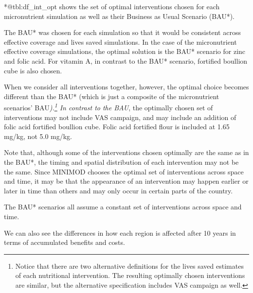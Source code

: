 \documentclass[
]{article}
\begin{document}
*@tbl:df\_int\_opt shows the set of optimal interventions chosen for
each micronutrient simulation as well as their Business as Usual
Scenario (BAU*).

The BAU* was chosen for each simulation so that it would be consistent
across effective coverage and lives saved simulations. In the case of
the micronutrient effective coverage simulations, the optimal solution
is the BAU* scenario for zinc and folic acid. For vitamin A, in contrast
to the BAU* scenario, fortified boullion cube is also chosen.

When we consider all interventions together, however, the optimal choice
becomes different than the BAU* (which is just a composite of the
micronutrient scenarios' BAU\emph{).\footnote{Notice that there are two
  alternative definitions for the lives saved estimates of each
  nutritional intervention. The resulting optimally chosen interventions
  are similar, but the alternative specification includes VAS campaign
  as well.} In contrast to the BAU}, the optimally chosen set of
interventions may not include VAS campaign, and may include an addition
of folic acid fortified boullion cube. Folic acid fortified flour is
included at 1.65 mg/kg, not 5.0 mg/kg.

Note that, although some of the interventions chosen optimally are the
same as in the BAU*, the timing and spatial distribution of each
intervention may not be the same. Since MINIMOD chooses the optimal set
of interventions across space and time, it may be that the appearance of
an intervention may happen earlier or later in time than others and may
only occur in certain parts of the country.

The BAU* scenarios all assume a constant set of interventions across
space and time.

We can also see the differences in how each region is affected after 10
years in terms of accumulated benefits and costs.
\end{document}
